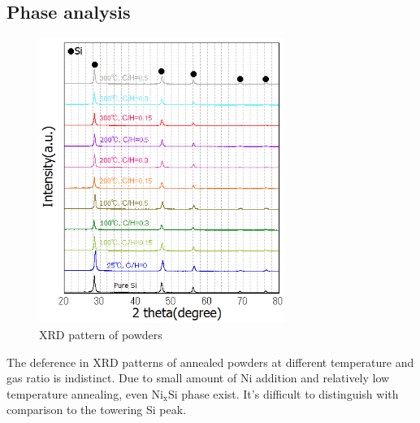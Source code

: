 \subsection{Phase analysis}
\begin{figure}[h]
\centering
\includegraphics[width=8cm]{src/fig/fig47.png}
\caption{XRD pattern of powders}
\end{figure}
The deference in XRD patterns of annealed powders at different temperature and gas ratio is indistinct. Due to small amount of Ni addition and relatively low temperature annealing, even $\mathrm{Ni_{x}Si}$ phase exist. It’s difficult to distinguish with comparison to the towering Si peak.

